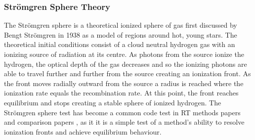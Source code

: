 \documentclass[fleq,usenatbib]{mnras}
\newcommand{\strom}{Str\"omgren}
\begin{document}
\subsubsection{\strom{} Sphere Theory}
The \strom{} sphere is a theoretical ionized sphere of gas first discussed by 
Bengt \strom{} in 1938 \citep{stromgren39} as a model of regions around hot, 
young stars. The theoretical initial conditions consist of a cloud neutral 
hydrogen gas with an ionizing source of radiation at its centre. As photons 
from the source ionize the hydrogen, the optical depth of the gas decreases 
and so the ionizing photons are able to travel further and further from the 
source creating an ionization front. As the front moves radially outward from 
the source a radius is reached where the ionization rate equals the 
recombination rate. At this point, the front reaches equilibrium and stops 
creating a stable sphere of ionized hydrogen. The \strom{} sphere test has 
become a common code test in RT methods papers \citep{pawlikSchaye08,
pawlikSchaye11, petkovaSpringel11} and comparison papers \citep{ilievEt06, 
ilievEt09}, as it it is a simple test of a method's ability to resolve 
ionization fronts and achieve equilibrium behaviour.
\end{document}
